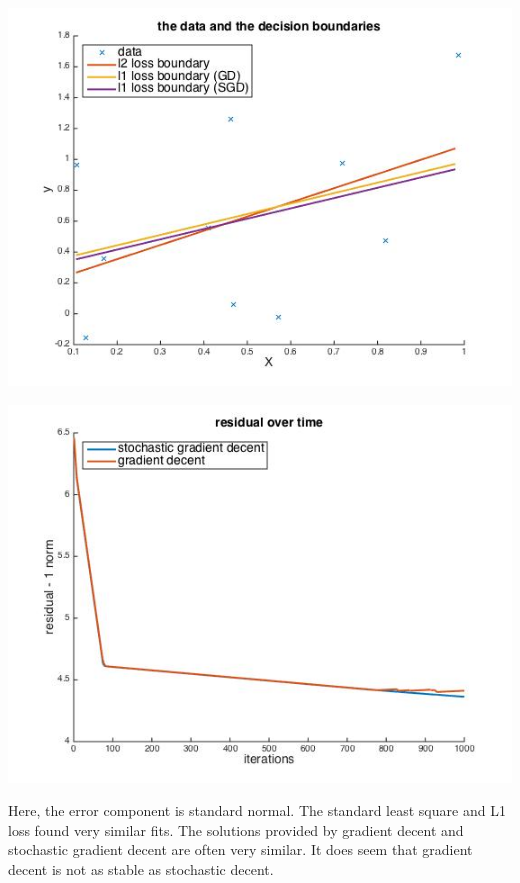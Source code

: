 \documentclass[paper=a4, fontsize=11pt]{scrartcl} %
\numberwithin{equation}{section} %
\numberwithin{figure}{section} %
\numberwithin{table}{section} %
\begin{document}
\begin{center}
\includegraphics[scale=.5]{hw7_2a_fit.jpg}
\end{center}
\begin{center}
\includegraphics[scale=.5]{hw7_2a_gdsgd.jpg}
\end{center}

Here, the error component is standard normal. The standard least square and L1 loss found very similar fits. The solutions provided by gradient decent and stochastic gradient decent are often very similar. It does seem that gradient decent is not as stable as stochastic decent. 
\end{document}
